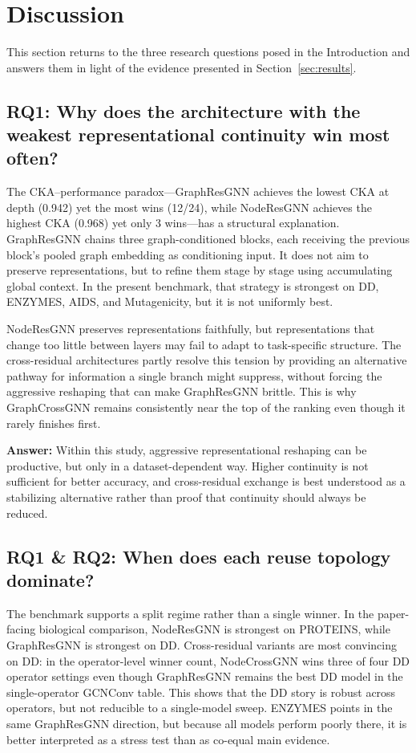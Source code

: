 \section{Discussion}

This section returns to the three research questions posed in the Introduction and answers them in light of the evidence presented in Section~\ref{sec:results}.

\subsection{RQ1: Why does the architecture with the weakest representational continuity win most often?}

The CKA--performance paradox---GraphResGNN achieves the lowest CKA at depth (0.942) yet the most wins (12/24), while NodeResGNN achieves the highest CKA (0.968) yet only 3 wins---has a structural explanation. GraphResGNN chains three graph-conditioned blocks, each receiving the previous block's pooled graph embedding as conditioning input. It does not aim to preserve representations, but to refine them stage by stage using accumulating global context. In the present benchmark, that strategy is strongest on DD, ENZYMES, AIDS, and Mutagenicity, but it is not uniformly best.

NodeResGNN preserves representations faithfully, but representations that change too little between layers may fail to adapt to task-specific structure. The cross-residual architectures partly resolve this tension by providing an alternative pathway for information a single branch might suppress, without forcing the aggressive reshaping that can make GraphResGNN brittle. This is why GraphCrossGNN remains consistently near the top of the ranking even though it rarely finishes first.

\textbf{Answer:} Within this study, aggressive representational reshaping can be productive, but only in a dataset-dependent way. Higher continuity is not sufficient for better accuracy, and cross-residual exchange is best understood as a stabilizing alternative rather than proof that continuity should always be reduced.

\subsection{RQ1 \& RQ2: When does each reuse topology dominate?}

The benchmark supports a split regime rather than a single winner. In the paper-facing biological comparison, NodeResGNN is strongest on PROTEINS, while GraphResGNN is strongest on DD. Cross-residual variants are most convincing on DD: in the operator-level winner count, NodeCrossGNN wins three of four DD operator settings even though GraphResGNN remains the best DD model in the single-operator GCNConv table. This shows that the DD story is robust across operators, but not reducible to a single-model sweep. ENZYMES points in the same GraphResGNN direction, but because all models perform poorly there, it is better interpreted as a stress test than as co-equal main evidence.

